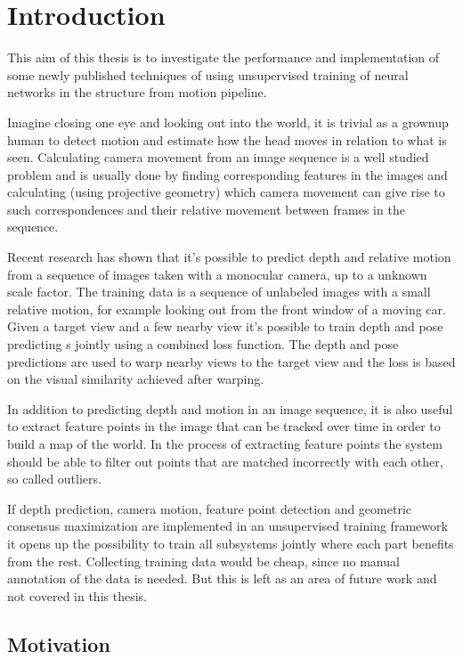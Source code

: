\chapter{Introduction}\label{cha:introduction}

This aim of this thesis is to investigate the performance and implementation of some newly published techniques of using unsupervised training of neural networks in the structure from motion pipeline. 

Imagine closing one eye and looking out into the world, it is trivial as a grownup human to detect motion and estimate how the head moves in relation to what is seen. Calculating camera movement from an image sequence is a well studied problem and is usually done by finding corresponding features in the images and calculating (using projective geometry) which camera movement can give rise to such correspondences and their relative movement between frames in the sequence.

Recent research has shown that it's possible to predict depth and relative motion from a sequence of images taken with a monocular \abbrRGB camera, up to a unknown scale factor. The training data is a sequence of unlabeled images with a small relative motion, for example looking out from the front window of a moving car. Given a target view and a few nearby view it's possible to train depth and pose predicting \abbrCNN{}s jointly using a combined loss function. The depth and pose predictions are used to warp nearby views to the target view and the loss is based on the visual similarity achieved after warping.

In addition to predicting depth and motion in an image sequence, it is also useful to extract feature points in the image that can be tracked over time in order to build a map of the world. In the process of extracting feature points the system should be able to filter out points that are matched incorrectly with each other, so called outliers.

If depth prediction, camera motion, feature point detection and geometric consensus maximization are implemented in an unsupervised training framework it opens up the possibility to train all subsystems jointly where each part benefits from the rest. Collecting training data would be cheap, since no manual annotation of the data is needed. But this is left as an area of future work and not covered in this thesis.

\section{Motivation}

